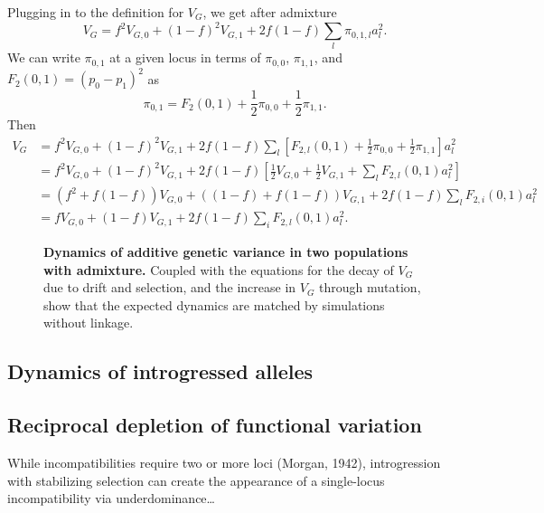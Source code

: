\documentclass{article}
\begin{document}
Plugging in to the definition for $V_G$, we get after admixture
\[V_G = f^2 V_{G,0} + (1-f)^2 V_{G,1} + 2f(1-f)\sum_l \pi_{0,1,l}a_l^2.\]
We can write $\pi_{0,1}$ at a given locus in terms of $\pi_{0,0}$, $\pi_{1,1}$,
and $F_2(0,1)=(p_0-p_1)^2$ as \citep{peter2016admixture}
\[\pi_{0,1} = F_2(0,1) + \frac{1}{2}\pi_{0,0} + \frac{1}{2}\pi_{1,1}.\]
Then
\begin{align*}
    V_G & = f^2 V_{G,0} + (1-f)^2 V_{G,1} + 2f(1-f)\sum_l \left[F_{2,l}(0,1)
    + \frac{1}{2}\pi_{0,0} + \frac{1}{2}\pi_{1,1}\right] a_l^2 \\
    & = f^2 V_{G,0} + (1-f)^2 V_{G,1} + 2f(1-f)\left[\frac{1}{2}V_{G,0} 
    + \frac{1}{2}V_{G,1} + \sum_l F_{2,l}(0,1)a_l^2\right] \\
    & = \left(f^2 + f(1-f)\right) V_{G,0} + \left((1-f) + f(1-f)\right)V_{G,1}
    + 2f(1-f) \sum_l F_{2,i}(0,1)a_l^2 \\
    & = f V_{G,0} + (1-f)V_{G,1} + 2f(1-f)\sum_i F_{2,l}(0,1)a_l^2.
\end{align*}


\begin{figure}[tb!]
    \centering
    \caption{
        \textbf{Dynamics of additive genetic variance in two populations with admixture.}
        Coupled with the equations for the decay of $V_G$ due to drift and selection,
        and the increase in $V_G$ through mutation, show that the expected dynamics
        are matched by simulations without linkage.
    }
    \label{fig:VG_dynamics}
\end{figure}

\subsection{Dynamics of introgressed alleles}

\subsection{Reciprocal depletion of functional variation}

While incompatibilities require two or more loci (Morgan, 1942), introgression
with stabilizing selection can create the appearance of a single-locus
incompatibility via underdominance\dots
\end{document}
